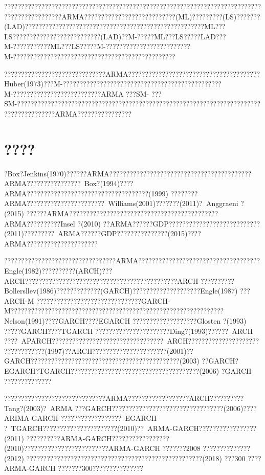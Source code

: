 \documentclass[a4paper,12pt,openany,oneside,utf-8]{ctexbook}
\begin{document}
	?????????????????????????????????????????????????????????????????????????????????????????????ARMA???????????????????????????(ML)?????????(LS)???????(LAD)?????????????????????????????????????????????????????ML???LS??????????????????????????(LAD)??M-?????ML???LS?????LAD???M-???????????ML???LS?????M-?????????????????????????M-????????????????????????????????????????????????
	
	??????????????????????????????ARMA???????????????????????????????????????Huber(1973)???M-???????????????????????????????????????????????M-??????????????????????????ARMA ???SM- ???SM-???????????????????????????????????????????????????????????????????????????????????????ARMA????????????????
	
	\section{????}
	
	?Box?Jenkins(1970)??????ARMA??????????????????????????????????????????ARMA????????????????~Box?(1994)????ARMA????????????????????????????????????(1999) ????????ARMA???????????????????????~Williams(2001)???????(2011)?~Anggraeni ?(2015) ??????ARMA????????????????????????????????????????????ARMA??????????Insel ?(2010) ??ARMA??????GDP???????????????????????????(2011)?????????~ARMA??????GDP???????????????(2015)????ARMA?????????????????????
	
	?????????????????????????????????ARMA????????????????????????????????????Engle(1982)??????????(ARCH)???ARCH?????????????????????????????????????????????ARCH ??????????Bollersllev(1986)?????????????(GARCH)????????????????????Engle(1987) ???ARCH-M ???????????????????????????????GARCH-M???????????????????????????????????????????????????????????????Nelson(1991)????GARCH????EGARCH ???????????????????Glosten ?(1993) ?????GARCH????TGARCH ??????????????????????Ding?(1993)??????~ARCH ????~APARCH?????????????????????????????????~ARCH?????????????????????????????????(1997)??ARCH??????????????????????(2001)??GARCH????????????????????????????????????????????(2003) ??GARCH?EGARCH?TGARCH??????????????????????????????????????(2006) ?GARCH ??????????????
	
	??????????????????????????????ARMA??????????????????ARCH??????????Tang?(2003)?~ARMA ???GARCH?????????????????????????????????(2006)????ARIMA-GARCH ??????????????????~EGARCH ?~TGARCH??????????????????????(2010)??~ARMA-GARCH?????????????????(2011) ??????????ARMA-GARCH?????????????????(2010)?????????????????????????ARMA-GARCH ???????2008 ??????????????(2012) ????????????????????????????????????????????????????(2018) ???300 ????ARMA-GARCH ???????300???????????????
	
\end{document}
